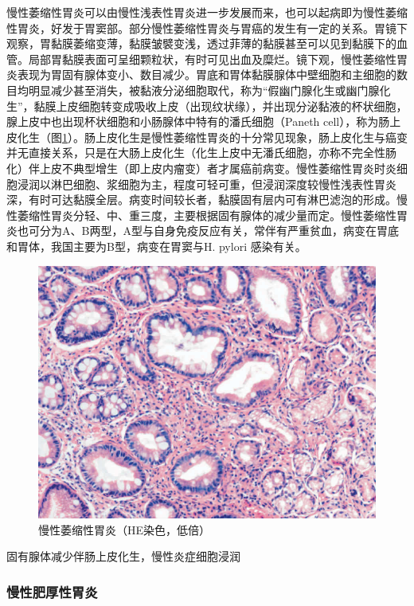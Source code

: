 慢性萎缩性胃炎可以由慢性浅表性胃炎进一步发展而来，也可以起病即为慢性萎缩性胃炎，好发于胃窦部。部分慢性萎缩性胃炎与胃癌的发生有一定的关系。胃镜下观察，胃黏膜萎缩变薄，黏膜皱襞变浅，透过菲薄的黏膜甚至可以见到黏膜下的血管。局部胃黏膜表面可呈细颗粒状，有时可见出血及糜烂。镜下观，慢性萎缩性胃炎表现为胃固有腺体变小、数目减少。胃底和胃体黏膜腺体中壁细胞和主细胞的数目均明显减少甚至消失，被黏液分泌细胞取代，称为“假幽门腺化生或幽门腺化生”，黏膜上皮细胞转变成吸收上皮（出现纹状缘），并出现分泌黏液的杯状细胞，腺上皮中也出现杯状细胞和小肠腺体中特有的潘氏细胞（Paneth
cell），称为肠上皮化生（图\ref{fig8-1}）。肠上皮化生是慢性萎缩性胃炎的十分常见现象，肠上皮化生与癌变并无直接关系，只是在大肠上皮化生（化生上皮中无潘氏细胞，亦称不完全性肠化）伴上皮不典型增生（即上皮内瘤变）者才属癌前病变。慢性萎缩性胃炎时炎细胞浸润以淋巴细胞、浆细胞为主，程度可轻可重，但浸润深度较慢性浅表性胃炎深，有时可达黏膜全层。病变时间较长者，黏膜固有层内可有淋巴滤泡的形成。慢性萎缩性胃炎分轻、中、重三度，主要根据固有腺体的减少量而定。慢性萎缩性胃炎也可分为A、B两型，A型与自身免疫反应有关，常伴有严重贫血，病变在胃底和胃体，我国主要为B型，病变在胃窦与H.
{pylori} 感染有关。

\begin{figure}[!htbp]
 \centering
 \includegraphics{./images/Image00126.jpg}
 \captionsetup{justification=centering}
 \caption{慢性萎缩性胃炎（HE染色，低倍）}
 \label{fig8-1}
  \end{figure} 

{固有腺体减少伴肠上皮化生，慢性炎症细胞浸润}

\subsubsection{慢性肥厚性胃炎}

